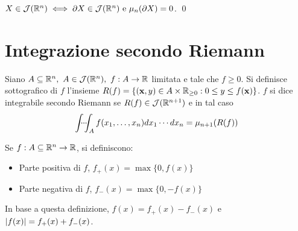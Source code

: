 \begin{lemma}
    $X \in \mathcal{J}(\mathbb{R}^n) \iff \partial X \in \mathcal{J}(\mathbb{R}^n) \text{ e } \mu_n(\partial X)=0$.
    \qed
\end{lemma}

\section{Integrazione secondo Riemann}

\begin{definition}
    Siano $A \subseteq \mathbb{R}^n, \ A \in \mathcal{J}(\mathbb{R}^n), \ f: A \to \mathbb{R}$ limitata e tale che $f \geq 0$. Si definisce sottografico di $f$ l'insieme $R(f)=\{(\vb{x}, y)\in A \times \mathbb{R}_{\geq 0} : 0 \leq y \leq f(\vb{x})\}$.
    $f$ si dice integrabile secondo Riemann se $R(f) \in \mathcal{J}(\mathbb{R}^{n+1})$ e in tal caso
    \begin{equation*}
        \idotsint_A f(x_1,\dots,x_n)dx_1\cdots dx_n=\mu_{n+1}(R(f))
    \end{equation*}
\end{definition}

\begin{definition}
    Se $f:A \subseteq \mathbb{R}^n \to \mathbb{R}$, si definiscono:
    \begin{itemize}
        \item Parte positiva di $f$, $f_+(x)=\max\{0,f(x)\}$
        \item Parte negativa di $f$, $f_-(x)=\max\{0,-f(x)\}$
    \end{itemize}
    In base a questa definizione, $f(x)=f_+(x)-f_-(x)$ e $\abs{f(x)}=f_+(x)+f_-(x)$.
\end{definition}

\begin{definition}
\end{definition}